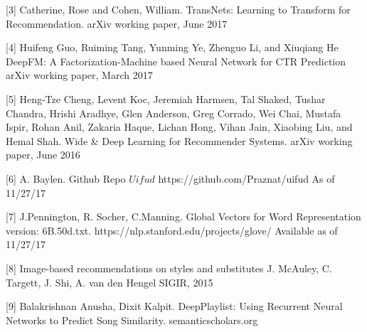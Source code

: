 \documentclass[10pt,twocolumn,letterpaper]{article}
\begin{document}
[3] Catherine, Rose and Cohen, William. TransNets: Learning to Transform
for Recommendation. arXiv working paper, June 2017

[4] Huifeng Guo, Ruiming Tang, Yunming Ye, Zhenguo Li, and Xiuqiang He
DeepFM: A Factorization-Machine based Neural Network for CTR Prediction
arXiv working paper, March 2017

[5] Heng-Tze Cheng, Levent Koc, Jeremiah Harmsen, Tal Shaked, Tushar Chandra, Hrishi Aradhye, Glen Anderson, Greg Corrado, Wei Chai, Mustafa Ispir, Rohan Anil, Zakaria Haque, Lichan Hong, Vihan Jain, Xiaobing Liu, and Hemal Shah.
Wide \& Deep Learning for Recommender Systems. arXiv working paper, June 2016

[6] A. Baylen. Github Repo $Uifud$
https://github.com/Praznat/uifud
As of 11/27/17 

[7] J.Pennington, R. Socher, C.Manning. Global Vectors for Word Representation 
version: 6B.50d.txt. https://nlp.stanford.edu/projects/glove/ 
Available as of 11/27/17 

[8] Image-based recommendations on styles and substitutes
J. McAuley, C. Targett, J. Shi, A. van den Hengel
SIGIR, 2015

[9] Balakrishnan Anusha, Dixit Kalpit. DeepPlaylist: Using Recurrent Neural Networks to
Predict Song Similarity. semanticscholars.org 
\end{document}
